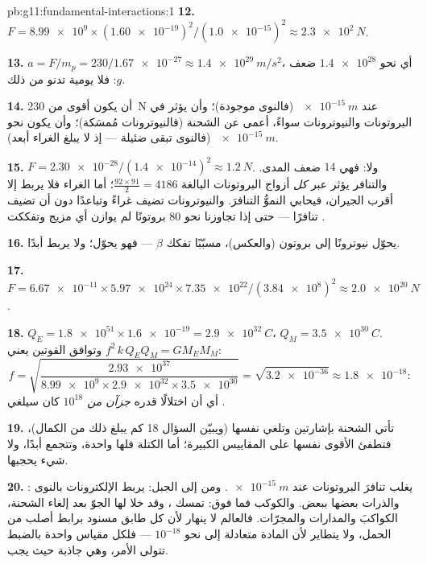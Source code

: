 \begin{solution}{pb:g11:fundamental-interactions:1}
\textbf{12.} $F = \num{8.99e9} \times (\num{1.60e-19})^2 /
(\num{1.0e-15})^2 \approx \qty{2.3e2}{N}$.

\textbf{13.} $a = F/m_p = 230/\num{1.67e-27} \approx
\qty{1.4e29}{m/s^2}$، أي نحو $\num{1.4e28}$ ضعف $g$: فلا  يومية
تدنو من ذلك.

\textbf{14.} أن يكون أقوى من \qty{230}{N} عند $\qty{e-15}{m}$ (فالنوى
موجودة)؛ وأن يؤثر في البروتونات والنيوترونات سواءً، أعمى عن الشحنة (فالنيوترونات
مُمسَكة)؛ وأن يكون  نحو $\qty{e-15}{m}$ (فالنوى تبقى ضئيلة ---
إذ لا يبلغ الغراء أبعد).

\textbf{15.} $F = \num{2.30e-28}/(\num{1.4e-14})^2 \approx
\qty{1.2}{N}$. ولا: فهي $14$ ضعف المدى. والتنافر يؤثر عبر
\emph{كل} أزواج البروتونات البالغة $\frac{92\times91}{2} = 4186$؛ أما الغراء فلا يربط
إلا أقرب الجيران، فيحابي النموُّ التنافرَ. والنيوترونات تضيف غراءً
وتباعدًا دون أن تضيف تنافرًا --- حتى إذا تجاوزنا نحو $80$
بروتونًا لم يوازن أي مزيج وتفككت .

\textbf{16.} يحوّل  نيوترونًا إلى بروتون (والعكس)،
مسبّبًا تفكك $\beta$ --- فهو يحوّل؛ ولا يربط أبدًا.

\textbf{17.} $F = \num{6.67e-11} \times \num{5.97e24} \times
\num{7.35e22}/(\num{3.84e8})^2 \approx \qty{2.0e20}{N}$.

\textbf{18.} $Q_E = \num{1.8e51} \times \num{1.6e-19} =
\qty{2.9e32}{C}$، $Q_M = \qty{3.5e30}{C}$. وتوافق القوتين يعني
$f^2\,k\,Q_E Q_M = G M_E M_M$:
\[
f = \sqrt{\frac{\num{2.93e37}}{\num{8.99e9} \times \num{2.9e32}
\times \num{3.5e30}}} = \sqrt{\num{3.2e-36}} \approx \num{1.8e-18} :
\]
أي أن اختلالًا قدره \emph{جزآن من $10^{18}$} كان سيلغي .

\textbf{19.} تأتي الشحنة بإشارتين وتلغي نفسها (ويبيّن السؤال 18
كم يبلغ ذلك من الكمال)، فتطفئ  الأقوى نفسها على المقاييس
الكبيرة؛ أما الكتلة فلها  واحدة، وتتجمع أبدًا، ولا شيء يحجبها.

\textbf{20.} : يغلب  تنافرَ
البروتونات عند $\qty{e-15}{m}$. ومن  إلى الجبل: يربط  الإلكترونات بالنوى والذرات بعضها ببعض. والكوكب
فما فوق: تمسك ، وقد خلا لها الجوّ بعد إلغاء الشحنة، الكواكبَ
والمدارات والمجرّات. فالعالم لا ينهار لأن كل طابق
مسنود برابط أصلب من الحمل، ولا يتطاير
لأن المادة متعادلة إلى نحو $10^{-18}$ --- فلكل مقياس
 واحدة بالضبط تتولى الأمر، وهي جاذبة حيث يجب.
\end{solution}
